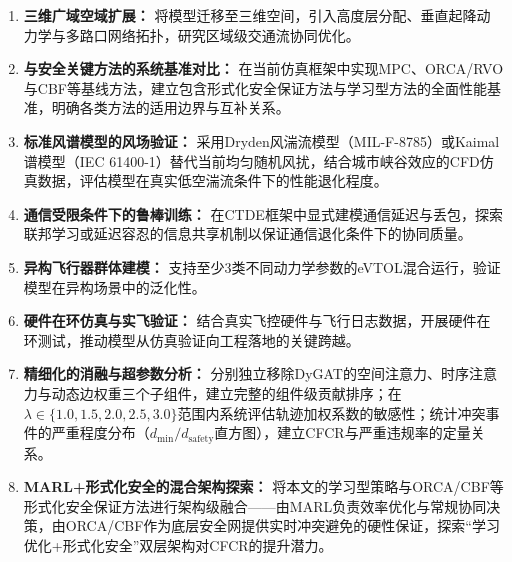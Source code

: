 \documentclass[12pt,a4paper,UTF8]{ctexart}
\begin{document}
\begin{enumerate}[label=(\arabic*)]
    \item \textbf{三维广域空域扩展：} 将模型迁移至三维空间，引入高度层分配、垂直起降动力学与多路口网络拓扑，研究区域级交通流协同优化。
    \item \textbf{与安全关键方法的系统基准对比：} 在当前仿真框架中实现MPC、ORCA/RVO与CBF等基线方法，建立包含形式化安全保证方法与学习型方法的全面性能基准，明确各类方法的适用边界与互补关系。
    \item \textbf{标准风谱模型的风场验证：} 采用Dryden风湍流模型（MIL-F-8785）或Kaimal谱模型（IEC 61400-1）替代当前均匀随机风扰，结合城市峡谷效应的CFD仿真数据，评估模型在真实低空湍流条件下的性能退化程度。
    \item \textbf{通信受限条件下的鲁棒训练：} 在CTDE框架中显式建模通信延迟与丢包，探索联邦学习或延迟容忍的信息共享机制以保证通信退化条件下的协同质量。
    \item \textbf{异构飞行器群体建模：} 支持至少3类不同动力学参数的eVTOL混合运行，验证模型在异构场景中的泛化性。
    \item \textbf{硬件在环仿真与实飞验证：} 结合真实飞控硬件与飞行日志数据，开展硬件在环测试，推动模型从仿真验证向工程落地的关键跨越。
    \item \textbf{精细化的消融与超参数分析：} 分别独立移除DyGAT的空间注意力、时序注意力与动态边权重三个子组件，建立完整的组件级贡献排序；在$\lambda \in \{1.0, 1.5, 2.0, 2.5, 3.0\}$范围内系统评估轨迹加权系数的敏感性；统计冲突事件的严重程度分布（$d_{\min}/d_{\text{safety}}$直方图），建立CFCR与严重违规率的定量关系。
    \item \textbf{MARL+形式化安全的混合架构探索：} 将本文的学习型策略与ORCA/CBF等形式化安全保证方法进行架构级融合——由MARL负责效率优化与常规协同决策，由ORCA/CBF作为底层安全网提供实时冲突避免的硬性保证，探索``学习优化+形式化安全''双层架构对CFCR的提升潜力。
\end{enumerate}
\end{document}
